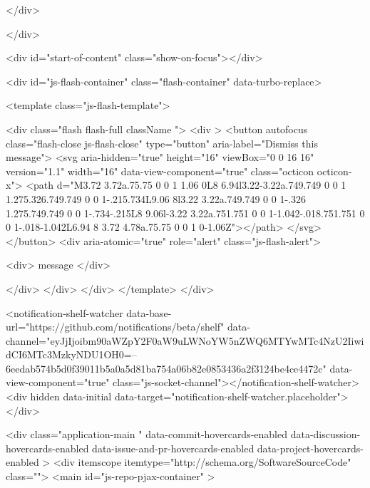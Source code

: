 {{  
</div>
        
          
    </div>

  <div id="start-of-content" class="show-on-focus"></div>








    <div id="js-flash-container" class="flash-container" data-turbo-replace>




  <template class="js-flash-template">
    
<div class="flash flash-full   {{ className }}">
  <div >
    <button autofocus class="flash-close js-flash-close" type="button" aria-label="Dismiss this message">
      <svg aria-hidden="true" height="16" viewBox="0 0 16 16" version="1.1" width="16" data-view-component="true" class="octicon octicon-x">
    <path d="M3.72 3.72a.75.75 0 0 1 1.06 0L8 6.94l3.22-3.22a.749.749 0 0 1 1.275.326.749.749 0 0 1-.215.734L9.06 8l3.22 3.22a.749.749 0 0 1-.326 1.275.749.749 0 0 1-.734-.215L8 9.06l-3.22 3.22a.751.751 0 0 1-1.042-.018.751.751 0 0 1-.018-1.042L6.94 8 3.72 4.78a.75.75 0 0 1 0-1.06Z"></path>
</svg>
    </button>
    <div aria-atomic="true" role="alert" class="js-flash-alert">
      
      <div>{{ message }}</div>

    </div>
  </div>
</div>
  </template>
</div>


    
  <notification-shelf-watcher data-base-url="https://github.com/notifications/beta/shelf" data-channel="eyJjIjoibm90aWZpY2F0aW9uLWNoYW5nZWQ6MTYwMTc4NzU2IiwidCI6MTc3MzkyNDU1OH0=--6eedab574b5d0f39011b5a0a5d81ba754a06b82e0853436a2f3124be4ce4472c" data-view-component="true" class="js-socket-channel"></notification-shelf-watcher>
  <div hidden data-initial data-target="notification-shelf-watcher.placeholder"></div>






  <div
    class="application-main "
    data-commit-hovercards-enabled
    data-discussion-hovercards-enabled
    data-issue-and-pr-hovercards-enabled
    data-project-hovercards-enabled
  >
        <div itemscope itemtype="http://schema.org/SoftwareSourceCode" class="">
    <main id="js-repo-pjax-container" >
      
      






}}
